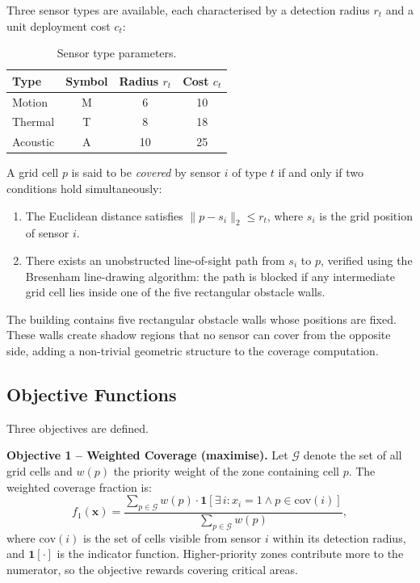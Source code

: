 \documentclass[12pt,a4paper]{article}
\begin{document}
Three sensor types are available, each characterised by a detection radius $r_t$ and a unit deployment cost $c_t$:

\begin{table}[H]
  \centering
  \caption{Sensor type parameters.}
  \label{tab:sensor_types}
  \begin{tabular}{lccc}
    \toprule
    \textbf{Type} & \textbf{Symbol} & \textbf{Radius} $r_t$ & \textbf{Cost} $c_t$ \\
    \midrule
    Motion   & M & 6  & 10 \\
    Thermal  & T & 8  & 18 \\
    Acoustic & A & 10 & 25 \\
    \bottomrule
  \end{tabular}
\end{table}

A grid cell $p$ is said to be \emph{covered} by sensor $i$ of type $t$ if and only if two conditions hold simultaneously:
\begin{enumerate}
  \item The Euclidean distance satisfies $\|p - s_i\|_2 \leq r_t$, where $s_i$ is the grid position of sensor $i$.
  \item There exists an unobstructed line-of-sight path from $s_i$ to $p$, verified using the Bresenham line-drawing algorithm: the path is blocked if any intermediate grid cell lies inside one of the five rectangular obstacle walls.
\end{enumerate}

The building contains five rectangular obstacle walls whose positions are fixed.
These walls create shadow regions that no sensor can cover from the opposite side, adding a non-trivial geometric structure to the coverage computation.

\subsection{Objective Functions}

Three objectives are defined.

\textbf{Objective 1 -- Weighted Coverage (maximise).}
Let $\mathcal{G}$ denote the set of all grid cells and $w(p)$ the priority weight of the zone containing cell $p$.
The weighted coverage fraction is:
\begin{equation}
  f_1(\mathbf{x}) = \frac{\displaystyle\sum_{p \in \mathcal{G}} w(p) \cdot \mathbf{1}\!\left[\exists\, i : x_i = 1 \wedge p \in \text{cov}(i)\right]}
                        {\displaystyle\sum_{p \in \mathcal{G}} w(p)},
  \label{eq:f1}
\end{equation}
where $\text{cov}(i)$ is the set of cells visible from sensor $i$ within its detection radius, and $\mathbf{1}[\cdot]$ is the indicator function.
Higher-priority zones contribute more to the numerator, so the objective rewards covering critical areas.
\end{document}
